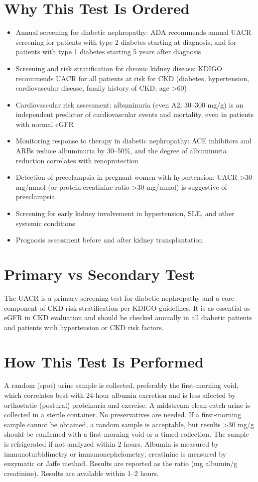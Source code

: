 \section*{Why This Test Is Ordered}
\begin{itemize}
  \item Annual screening for diabetic nephropathy: ADA recommends annual UACR screening for patients with type 2 diabetes starting at diagnosis, and for patients with type 1 diabetes starting 5 years after diagnosis \cite{ada2023standards}
  \item Screening and risk stratification for chronic kidney disease: KDIGO recommends UACR for all patients at risk for CKD (diabetes, hypertension, cardiovascular disease, family history of CKD, age >60) \cite{levey2015glomerular}
  \item Cardiovascular risk assessment: albuminuria (even A2, 30--300 mg/g) is an independent predictor of cardiovascular events and mortality, even in patients with normal eGFR
  \item Monitoring response to therapy in diabetic nephropathy: ACE inhibitors and ARBs reduce albuminuria by 30--50\%, and the degree of albuminuria reduction correlates with renoprotection \cite{dezeeuw2004albuminuria}
  \item Detection of preeclampsia in pregnant women with hypertension: UACR >30 mg/mmol (or protein:creatinine ratio >30 mg/mmol) is suggestive of preeclampsia
  \item Screening for early kidney involvement in hypertension, SLE, and other systemic conditions
  \item Prognosis assessment before and after kidney transplantation
\end{itemize}

\section*{Primary vs Secondary Test}
The UACR is a primary screening test for diabetic nephropathy and a core component of CKD risk stratification per KDIGO guidelines. It is as essential as eGFR in CKD evaluation and should be checked annually in all diabetic patients and patients with hypertension or CKD risk factors.

\section*{How This Test Is Performed}
A random (spot) urine sample is collected, preferably the first-morning void, which correlates best with 24-hour albumin excretion and is less affected by orthostatic (postural) proteinuria and exercise. A midstream clean-catch urine is collected in a sterile container. No preservatives are needed. If a first-morning sample cannot be obtained, a random sample is acceptable, but results >30 mg/g should be confirmed with a first-morning void or a timed collection. The sample is refrigerated if not analyzed within 2 hours. Albumin is measured by immunoturbidimetry or immunonephelometry; creatinine is measured by enzymatic or Jaffe method. Results are reported as the ratio (mg albumin/g creatinine). Results are available within 1--2 hours.

